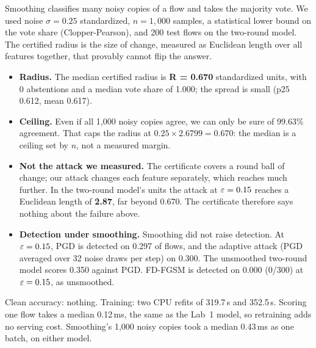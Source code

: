  Smoothing classifies many noisy copies of a flow and takes the majority vote. We used noise $\sigma=0.25$ standardized, $n=1{,}000$ samples, a statistical lower bound on the vote share (Clopper-Pearson), and 200 test flows on the two-round model. The certified radius is the size of change, measured as Euclidean length over all features together, that provably cannot flip the answer.
\begin{itemize}
\item \textbf{Radius.} The median certified radius is \textbf{R = 0.670} standardized units, with 0 abstentions and a median vote share of 1.000; the spread is small (p25 0.612, mean 0.617).
\item \textbf{Ceiling.} Even if all 1{,}000 noisy copies agree, we can only be sure of 99.63\% agreement. That caps the radius at $0.25\times2.6799=0.670$: the median is a ceiling set by $n$, not a measured margin.
\item \textbf{Not the attack we measured.} The certificate covers a round ball of change; our attack changes each feature separately, which reaches much further. In the two-round model's units the attack at $\varepsilon=0.15$ reaches a Euclidean length of \textbf{2.87}, far beyond 0.670. The certificate therefore says nothing about the failure above.
\item \textbf{Detection under smoothing.} Smoothing did not raise detection. At $\varepsilon=0.15$, PGD is detected on 0.297 of flows, and the adaptive attack (PGD averaged over 32 noise draws per step) on 0.300. The unsmoothed two-round model scores 0.350 against PGD. FD-FGSM is detected on 0.000 (0/300) at $\varepsilon=0.15$, as unsmoothed.
\end{itemize}

 Clean accuracy: nothing. Training: two CPU refits of 319.7\,s and 352.5\,s. Scoring one flow takes a median 0.12\,ms, the same as the Lab~1 model, so retraining adds no serving cost. Smoothing's 1{,}000 noisy copies took a median 0.43\,ms as one batch, on either model.

